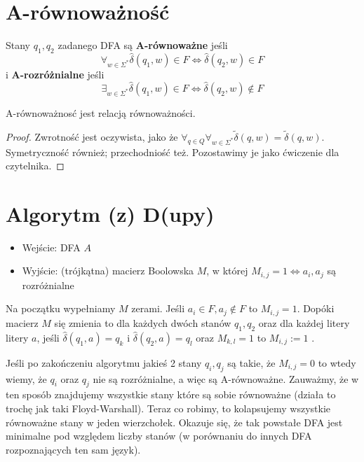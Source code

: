 \section{A-równoważność}

\begin{definition}
	Stany \( q_1, q_2 \) zadanego DFA są \textbf{A-równoważne} jeśli
	\[
		\forall_{w \in \Sigma^*} \hat \delta(q_1, w) \in F \iff \hat \delta(q_2, w) \in F
	\]
	i \textbf{A-rozróżnialne} jeśli
	\[
		\exists_{w \in \Sigma^*} \hat \delta(q_1, w) \in F \iff \hat \delta(q_2, w) \notin F
	\]
\end{definition}

\begin{lemma}
	A-równoważnosć jest relacją równoważności.
\end{lemma}
\begin{proof}
	Zwrotność jest oczywista, jako że \( \forall_{q\in Q} \forall_{w \in \Sigma^*} \tilde\delta(q, w) = \tilde\delta(q,w) \). Symetryczność również; przechodniość też. Pozostawimy je jako ćwiczenie dla czytelnika.
\end{proof}

\section{Algorytm (z) D(upy)}

\begin{itemize}
	\item Wejście: DFA \( A \)
	\item Wyjście: (trójkątna) macierz Boolowska \( M \), w której \( M_{i, j} = 1 \iff a_i, a_j \) są rozróżnialne
\end{itemize}

Na początku wypełniamy \( M \) zerami.
Jeśli \( a_i \in F, a_j \notin F \) to \( M_{i, j} = 1 \).
Dopóki macierz \( M \) się zmienia to dla każdych dwóch stanów \( q_1, q_2 \) oraz dla każdej litery litery \( a \), jeśli \( \hat \delta(q_1, a) = q_k\) i \( \hat \delta(q_2, a) = q_l \) oraz \( M_{k, l} = 1 \) to \( M_{i, j} := 1 \) .

Jeśli po zakończeniu algorytmu jakieś 2 stany \(q_i, q_j\) są takie, że \(M_{i,j} = 0\) to wtedy wiemy, że \(q_i\) oraz \(q_j\) nie są rozróżnialne, a więc są A-równoważne. Zauważmy, że w ten sposób znajdujemy wszystkie stany które są sobie równoważne (działa to trochę jak taki Floyd-Warshall). Teraz co robimy, to kolapsujemy wszystkie równoważne stany w jeden wierzchołek. Okazuje się, że tak powstałe DFA jest minimalne pod względem liczby stanów (w porównaniu do innych DFA rozpoznających ten sam język).

